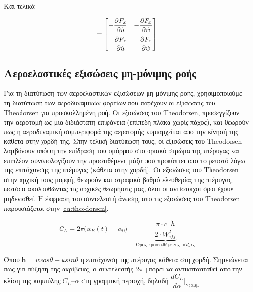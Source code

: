 \noindent Και τελικά

\begin{equation}
    [\mathbf{C}] = 
    \begin{bmatrix}
        -\dpart{F_x}{\dot{u}} & -\dpart{F_x}{\dot{w}}\\[10pt]
        -\dpart{F_z}{\dot{u}} & -\dpart{F_z}{\dot{w}}\\
    \end{bmatrix}
    \label{eq:steadyC}
\end{equation}

\subsection{Αεροελαστικές εξισώσεις μη-μόνιμης ροής}

Για τη διατύπωση των αεροελαστικών εξισώσεων μη-μόνιμης ροής, χρησιμοποιούμε τη διατύπωση των αεροδυναμικών φορτίων που παρέχουν οι εξισώσεις του Theodorsen για προσκολλημένη ροή. Οι εξισώσεις του Theodorsen, προσεγγίζουν την αεροτομή ως μια διδιάστατη επιφάνεια (επίπεδη πλάκα χωρίς πάχος), και θεωρούν πως η αεροδυναμική συμπεριφορά της αεροτομής κυριαρχείται απο την κίνησή της κάθετα στην χορδή της. Στην τελική διατύπωση τους, οι εξισώσεις του Theodorsen λαμβάνουν υπόψη την επίδραση του ομόρρου στο οριακό στρώμα της πτέρυγας και επιπλέον συνυπολογίζουν την προστιθέμενη μάζα που προκύπτει απο το ρευστό λόγω της επιτάχυνσης της πτέρυγας (κάθετα στην χορδή). Οι εξισώσεις του Theodorsen στην αρχική τους μορφή, θεωρούν και στροφικό βαθμό ελευθερίας της πτέρυγας, ωστόσο ακολουθώντας τις αρχικές θεωρήσεις μας, όλοι οι αντίστοιχοι όροι έχουν μηδενισθεί. Η έκφραση του συντελεστή άνωσης απο τις εξισώσεις του Theodorsen παρουσιάζεται στην \cref{eq:theodorsen}.

\begin{equation}
    C_L = 2\pi \Big(\alpha_{E}(t)-\alpha_0\Big) - \underbrace{\dfrac{\pi\cdot c\cdot \ddot{h}}{2\cdot W_{eff}^2}}_{\text{Όρος προστιθέμενης μάζας}}
    \label{eq:theodorsen}
\end{equation}

\noindent Όπου $\ddot{\mathbf{h}}=\ddot{w}cos\theta+\ddot{u}sin\theta$ η επιτάχυνση της πτέρυγας κάθετα στη χορδή.
Σημειώνεται πως για αύξηση της ακρίβειας, ο συντελεστής $2\pi$ μπορεί να αντικατασταθεί απο την κλίση της καμπύλης $C_L\text{--}\alpha$ στη γραμμική περιοχή, δηλαδή $\dfrac{dC_L}{d\alpha}\Bigg|_{\text{γραμμ}}$

\vspace{0.5cm}

